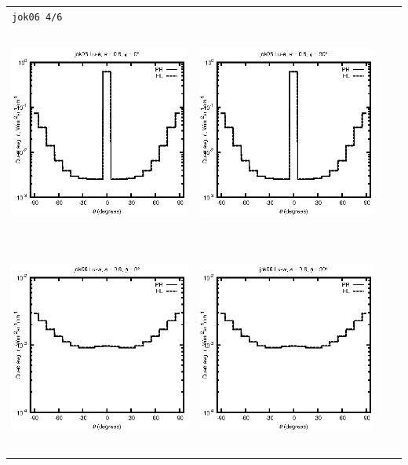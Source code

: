 \begin{tabular}{c c c c}
\multicolumn{4}{l}{\texttt{jok06 4/6}} \\
\includegraphics[height=7cm]{../eps/jok06_Lu_a_fwd.eps} &
\includegraphics[height=7cm]{../eps/jok06_Lu_a_cross.eps}\\
\includegraphics[height=7cm]{../eps/jok06_Lu_w_fwd.eps} &
\includegraphics[height=7cm]{../eps/jok06_Lu_w_cross.eps} \\

\end{tabular}
